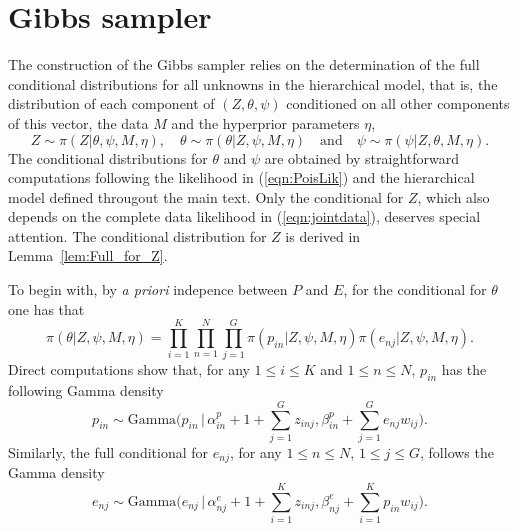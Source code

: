\documentclass[11pt]{amsart}
\theoremstyle{definition}
\theoremstyle{remark}
\begin{document}
\section{Gibbs sampler}
\label{sec:Gibbs}
The construction of the Gibbs sampler relies on the determination of
the full conditional distributions for all unknowns in the
hierarchical model, that is, the distribution of each component of
$(Z, \theta, \psi)$ conditioned on all other components of this vector,
the data $M$ and the hyperprior parameters $\eta$,
\[
   Z \sim \pi(Z|\theta, \psi, M, \eta), \quad
   \theta \sim \pi(\theta|Z, \psi, M, \eta) \quad
  \text{and}\quad
  \psi \sim \pi(\psi|Z, \theta, M, \eta).
\]
The conditional distributions for $\theta$ and $\psi$ are obtained by
straightforward computations following the likelihood in
(\ref{eqn:PoisLik}) and the hierarchical model defined througout the
main text. Only the conditional for $Z$, which also depends on the
complete data likelihood in (\ref{eqn:jointdata}), deserves special
attention. The conditional distribution for $Z$ is derived in
Lemma~\ref{lem:Full_for_Z}.


To begin with, by \emph{a priori} indepence between $P$ and $E$, for
the conditional for $\theta$ one has that 
\[
   \pi(\theta|Z, \psi, M, \eta) 
   = 
   \prod_{i=1}^K\prod_{n=1}^N\prod_{j=1}^G
    \pi(p_{in}|Z, \psi, M, \eta)
    \pi(e_{nj}|Z, \psi, M, \eta).
\]
Direct computations show that, for any $1 \leq i\leq K$ and $1\leq
n\leq  N$, $p_{in}$ has the following Gamma density
\begin{equation}
  \label{eqn:Full_for_P}
  p_{in} 
       \sim 
     \text{Gamma}\Big(p_{in}\,\Big|\, \alpha_{in}^p + 1 +
     \sum_{j=1}^G z_{inj}, \beta_{in}^p +
     \sum_{j=1}^G e_{nj}w_{ij}\Big).\tag{$s_2$}
\end{equation}
Similarly, the full conditional for $e_{nj}$, for any $1\leq n\leq 
N$, $1\leq j\leq G$, follows the Gamma density  
\begin{equation}
  \label{eqn:Full_for_E}
  e_{nj} 
     \sim 
   \text{Gamma}\Big(e_{nj}\,\Big|\, \alpha_{nj}^e + 1 +
   \sum_{i=1}^K z_{inj}, \beta_{nj}^e +
   \sum_{i=1}^K p_{in}w_{ij}\Big).\tag{$s_3$}
\end{equation}
\end{document}

